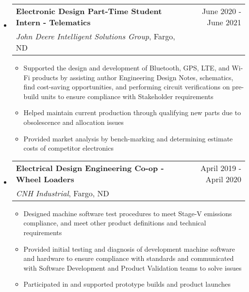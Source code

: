 \documentclass[letterpaper,11pt]{article}
\makeatletter
\newcommand{\sectionStart}{
  \begin{itemize}[label={},leftmargin=0in]
}
\newcommand{\sectionEnd}{
  \end{itemize}
}
\newcommand{\jobHeading}[4]{
  \vspace{-1pt}
  \item
  \begin{tabular*}{1.0\textwidth}{l@{\extracolsep{\fill}}r@{}}
    \normalsize{\textbf{#1}} & #2 \\
    \textit{\small#3}, {#4}\\
  \end{tabular*}\vspace{-5pt}
}
\newcommand{\listStart}{\begin{itemize}}
\newcommand{\listEnd}{\end{itemize}\vspace{-5pt}}
\newcommand{\bulletItem}[1]{
  \item
  \small{
    {#1 \vspace{-1.8pt}}
  }
}
\makeatother
\begin{document}
\sectionStart
  \jobHeading
    {Electronic Design Part-Time Student Intern - Telematics}
    {June 2020 - June 2021}
    {John Deere Intelligent Solutions Group}
    {Fargo, ND}
  \listStart
    \bulletItem
    {Supported the design and development of Bluetooth, GPS, LTE, and Wi-Fi products by assisting author Engineering Design Notes, schematics, find cost-saving opportunities, and performing circuit verifications on pre-build units to ensure compliance with Stakeholder requirements}
    \bulletItem
    {Helped maintain current production through qualifying new parts due to obsolescence and allocation issues}
    \bulletItem
    {Provided market analysis by bench-marking and determining estimate costs of competitor electronics}
  \listEnd
\sectionEnd

\sectionStart
  \jobHeading
    {Electrical Design Engineering Co-op - Wheel Loaders}
    {April 2019 - April 2020}
    {CNH Industrial}
    {Fargo, ND}
  \listStart
    \bulletItem
    {Designed machine software test procedures to meet Stage-V emissions compliance, and meet other product definitions and technical requirements}
    \bulletItem
    {Provided initial testing and diagnosis of development machine software and hardware to ensure compliance with standards and communicated with Software Development and Product Validation teams to solve issues}
    \bulletItem
    {Participated in and supported prototype builds and product launches}
  \listEnd
\sectionEnd
\end{document}
